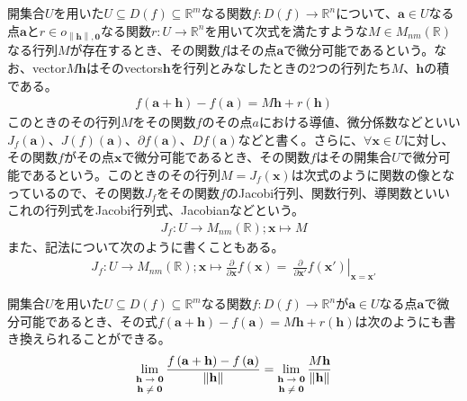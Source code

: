 \documentclass[dvipdfmx]{jsarticle}
\begin{document}
\begin{dfn}
開集合$U$を用いた$U \subseteq D(f) \subseteq \mathbb{R}^{m}$なる関数$f:D(f) \rightarrow \mathbb{R}^{n}$について、$\mathbf{a} \in U$なる点$\mathbf{a}$と$r \in o_{\left\| \mathbf{h} \right\|,\mathbf{0}}$なる関数$r:U \rightarrow \mathbb{R}^{n}$を用いて次式を満たすような$M \in M_{nm}\left( \mathbb{R} \right)$なる行列$M$が存在するとき、その関数$f$はその点$\mathbf{a}$で微分可能であるという。なお、vector$M\mathbf{h}$はそのvectors$\mathbf{h}$を行列とみなしたときの2つの行列たち$M$、$\mathbf{h}$の積である。
\begin{align*}
f\left( \mathbf{a} + \mathbf{h} \right) - f\left( \mathbf{a} \right) = M\mathbf{h} + r\left( \mathbf{h} \right)
\end{align*}
このときのその行列$M$をその関数$f$のその点$a$における導値、微分係数などといい$J_{f}\left( \mathbf{a} \right)$、$J(f)\left( \mathbf{a} \right)$、$\partial f\left( \mathbf{a} \right)$、$Df\left( \mathbf{a} \right)$などと書く。さらに、$\forall\mathbf{x} \in U$に対し、その関数$f$がその点$\mathbf{x}$で微分可能であるとき、その関数$f$はその開集合$U$で微分可能であるという。このときのその行列$M = J_{f}\left( \mathbf{x} \right)$は次式のように関数の像となっているので、その関数$J_{f}$をその関数$f$のJacobi行列、関数行列、導関数といいこれの行列式をJacobi行列式、Jacobianなどという。
\begin{align*}
J_{f}:U \rightarrow M_{nm}\left( \mathbb{R} \right);\mathbf{x} \mapsto M
\end{align*}
また、記法について次のように書くこともある。
\begin{align*}
J_{f}:U \rightarrow M_{nm}\left( \mathbb{R} \right);\mathbf{x} \mapsto \frac{\partial}{\partial\mathbf{x}}f\left( \mathbf{x} \right) = \left. \ \frac{\partial}{\partial\mathbf{x}'}f\left( \mathbf{x}' \right) \right|_{\mathbf{x} = \mathbf{x}'}
\end{align*}
\end{dfn}
\begin{thm}\label{4.2.6.2}
開集合$U$を用いた$U \subseteq D(f) \subseteq \mathbb{R}^{m}$なる関数$f:D(f) \rightarrow \mathbb{R}^{n}$が$\mathbf{a} \in U$なる点$\mathbf{a}$で微分可能であるとき、その式$f\left( \mathbf{a} + \mathbf{h} \right) - f\left( \mathbf{a} \right) = M\mathbf{h} + r\left( \mathbf{h} \right)$は次のようにも書き換えられることができる。
\begin{align*}
\lim_{\scriptsize \begin{matrix}
\mathbf{h} \rightarrow \mathbf{0} \\
\mathbf{h} \neq \mathbf{0} \\
\end{matrix}}\frac{f\left( \mathbf{a} + \mathbf{h} \right) - f\left( \mathbf{a} \right)}{\left\| \mathbf{h} \right\|} = \lim_{\scriptsize \begin{matrix}
\mathbf{h} \rightarrow \mathbf{0} \\
\mathbf{h} \neq \mathbf{0} \\
\end{matrix}}\frac{M\mathbf{h}}{\left\| \mathbf{h} \right\|}
\end{align*}
\end{thm}
\end{document}
